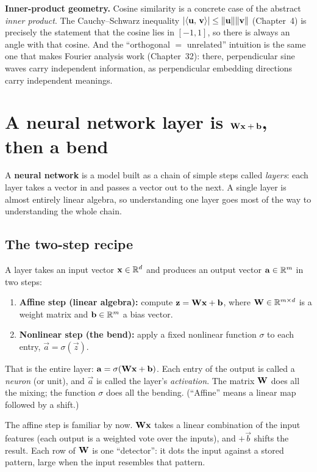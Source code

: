 \begin{connectionbox}
\textbf{Inner-product geometry.} Cosine similarity is a concrete case of the abstract
\emph{inner product}. The Cauchy--Schwarz inequality
$\lvert\langle \mathbf{u},\, \mathbf{v} \rangle\rvert \le \lVert\mathbf{u}\rVert\lVert\mathbf{v}\rVert$ (Chapter~4) is precisely
the statement that the cosine lies in $[-1,1]$, so there is always an angle with that
cosine. And the ``orthogonal $=$ unrelated'' intuition is the same one that makes Fourier
analysis work (Chapter~32): there, perpendicular sine waves carry independent information,
as perpendicular embedding directions carry independent meanings.
\end{connectionbox}

\section{A neural network layer is $\mathbf{W}\mathbf{x}+\mathbf{b}$, then a bend}
\label{ch34:nnlayer}

A \textbf{neural network} is a model built as a chain of simple steps called
\emph{layers}: each layer takes a vector in and passes a vector out to the next. A single
layer is almost entirely linear algebra, so understanding one layer goes most of the way
to understanding the whole chain.

\subsection{The two-step recipe}

A layer takes an input vector $\mathbf{x}\in\mathbb{R}^{d}$ and produces an output vector
$\mathbf{a}\in\mathbb{R}^{m}$ in two steps:
\begin{enumerate}
  \item \textbf{Affine step (linear algebra):} compute $\mathbf{z} = \mathbf{W}\mathbf{x} +
  \mathbf{b}$, where $\mathbf{W}\in\mathbb{R}^{m\times d}$ is a weight matrix and $\mathbf{b}\in\mathbb{R}^{m}$ a
  bias vector.
  \item \textbf{Nonlinear step (the bend):} apply a fixed nonlinear function $\sigma$ to
  each entry, $\vec{a} = \sigma(\vec{z})$.
\end{enumerate}
That is the entire layer: $\mathbf{a} = \sigma(\mathbf{W}\mathbf{x}+\mathbf{b})$. Each entry of the
output is called a \emph{neuron} (or unit), and $\vec{a}$ is called the layer's
\emph{activation}. The matrix $\mathbf{W}$ does all the mixing; the function $\sigma$ does all
the bending. (``Affine'' means a linear map followed by a shift.)

The affine step is familiar by now. $\mathbf{W}\mathbf{x}$ takes a
linear combination of the input features (each output is a weighted vote over the inputs),
and $+\vec{b}$ shifts the result. Each row of $\mathbf{W}$ is one ``detector'': it dots the
input against a stored pattern, large when the input resembles that pattern.

